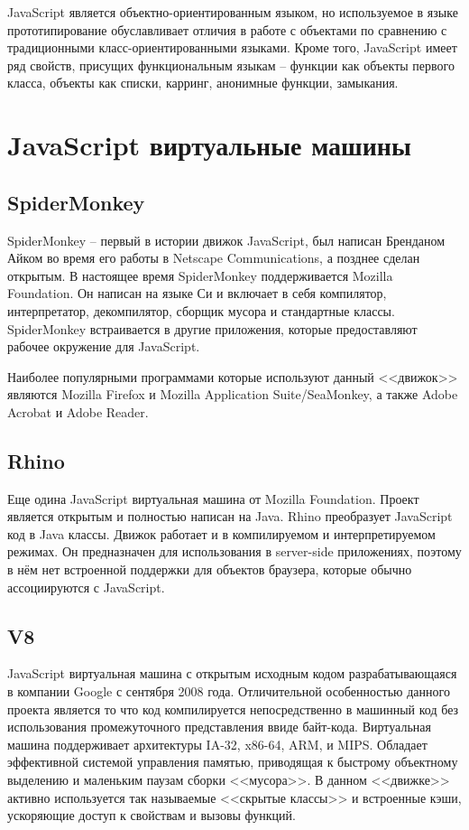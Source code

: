 JavaScript является объектно-ориентированным языком, но используемое в языке прототипирование обуславливает отличия в работе с объектами по сравнению с традиционными класс-ориентированными языками. Кроме того, JavaScript имеет ряд свойств, присущих функциональным языкам -- функции как объекты первого класса, объекты как списки, карринг, анонимные функции, замыкания.
\cite{wiki:JS:ru}

\section{JavaScript виртуальные машины}
 
\subsection{SpiderMonkey}

SpiderMonkey -- первый в истории движок JavaScript, был написан Бренданом Айком во время его работы в Netscape Communications, а позднее сделан открытым. В настоящее время SpiderMonkey поддерживается Mozilla Foundation. Он написан на языке Си и включает в себя компилятор, интерпретатор, декомпилятор, сборщик мусора и стандартные классы. SpiderMonkey встраивается в другие приложения, которые предоставляют рабочее окружение для JavaScript.

Наиболее популярными программами которые используют данный <<движок>> являются Mozilla Firefox и Mozilla Application Suite/SeaMonkey, а также Adobe Acrobat и Adobe Reader.
\cite{wiki:SpiderMonkey:ru}

\subsection{Rhino}

Еще одина JavaScript виртуальная машина от Mozilla Foundation. Проект является открытым и полностью написан на Java. Rhino преобразует JavaScript код в Java классы. Движок работает и в компилируемом и интерпретируемом режимах. Он предназначен для использования в server-side приложениях, поэтому в нём нет встроенной поддержки для объектов браузера, которые обычно ассоциируются с JavaScript.
\cite{wiki:Rhino:ru}

\subsection{V8}
JavaScript виртуальная машина с открытым исходным кодом разрабатывающаяся в компании Google с сентября 2008 года. Отличительной особенностью данного проекта является то что код компилируется непосредственно в машинный код без использования промежуточного представления ввиде байт-кода. Виртуальная машина поддерживает архитектуры IA-32, x86-64, ARM, и MIPS. Обладает эффективной системой управления памятью, приводящая к быстрому объектному выделению и маленьким паузам сборки <<мусора>>. В данном <<движке>> активно используется так называемые <<скрытые классы>> и встроенные кэши, ускоряющие доступ к свойствам и вызовы функций.

